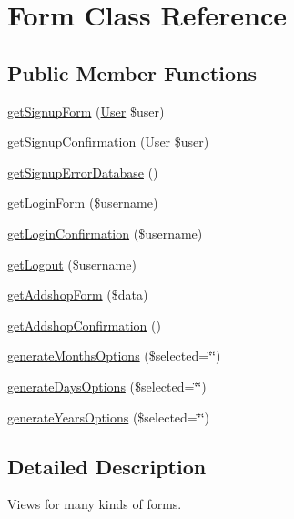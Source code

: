 \hypertarget{classForm}{\section{Form Class Reference}
\label{classForm}
}
\subsection*{Public Member Functions}
\begin{DoxyCompactItemize}
\item 
\hyperlink{classForm_af81406d5a0e7a81734e472af1758200a}{get\+Signup\+Form} (\hyperlink{classUser}{User} \$user)
\item 
\hyperlink{classForm_a6a05f450eb73a3524602817c34da17be}{get\+Signup\+Confirmation} (\hyperlink{classUser}{User} \$user)
\item 
\hyperlink{classForm_a11a02f548641b39c9c7c04436c95befa}{get\+Signup\+Error\+Database} ()
\item 
\hyperlink{classForm_a9336ceae0d84d10b3c14f7542c05d0cd}{get\+Login\+Form} (\$username)
\item 
\hyperlink{classForm_a61045a8ccfd7f300a729027a70a00700}{get\+Login\+Confirmation} (\$username)
\item 
\hyperlink{classForm_a08c23069323910390d5fc8d4ede9690d}{get\+Logout} (\$username)
\item 
\hyperlink{classForm_ac423ca7790207dbef532ae8141b4238f}{get\+Addshop\+Form} (\$data)
\item 
\hyperlink{classForm_a00d84099c9d0a8fd6cdc77983b2dac93}{get\+Addshop\+Confirmation} ()
\item 
\hyperlink{classForm_a12b1a6bb3a44baa1b311e8cc42759f9c}{generate\+Months\+Options} (\$selected=\char`\"{}\char`\"{})
\item 
\hyperlink{classForm_ae79e7e1de18f9f611d1e405349828104}{generate\+Days\+Options} (\$selected=\char`\"{}\char`\"{})
\item 
\hyperlink{classForm_a5bcd8bfb0770d2ca9e6874b329ab7f58}{generate\+Years\+Options} (\$selected=\char`\"{}\char`\"{})
\end{DoxyCompactItemize}


\subsection{Detailed Description}
Views for many kinds of forms. 

